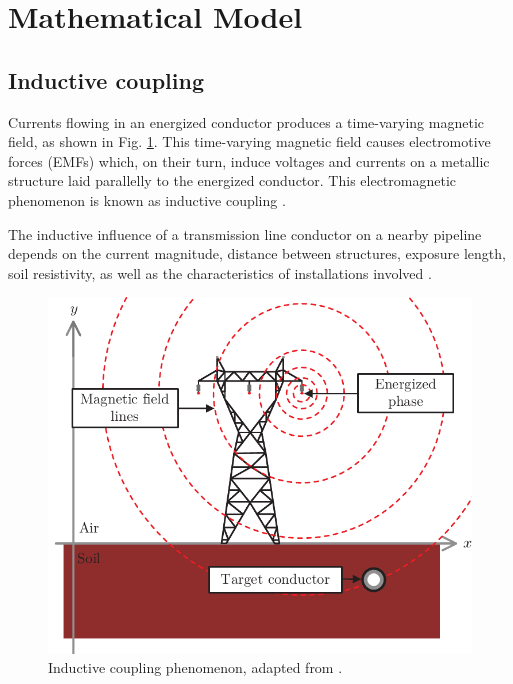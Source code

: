 \documentclass{IEEEtran4PSCC}
\begin{document}
\section{Mathematical Model}

\subsection{Inductive coupling}

Currents flowing in an energized conductor produces a time-varying magnetic field, as shown in Fig. \ref{fig:InductiveCoupling}. This time-varying magnetic field causes electromotive forces (EMFs) which, on their turn, induce voltages and currents on a metallic structure laid parallelly to the energized conductor. This electromagnetic phenomenon is known as inductive coupling \cite{CIGREWG36}.

The inductive influence of a transmission line conductor on a nearby pipeline depends on the current magnitude, distance between structures, exposure length, soil resistivity, as well as the characteristics of installations involved \cite{CIGREWG36}.

\begin{figure}[hbt]
	\begin{center}
		\includegraphics[width=1\columnwidth]{./fig/induc_coup2.pdf}
		\caption{Inductive coupling phenomenon, adapted from \cite{Martins-Britto2020}.}
		\label{fig:InductiveCoupling}
	\end{center}
\end{figure}
\end{document}
